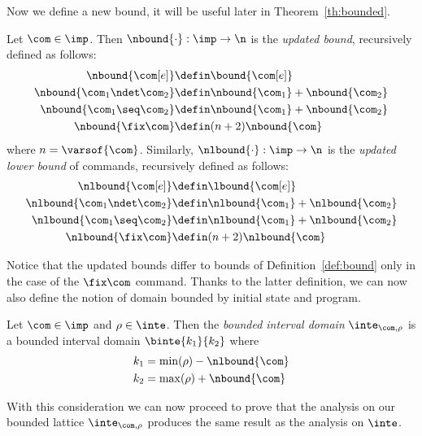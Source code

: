 Now we define a new bound, it will be useful later in
Theorem~\ref{th:bounded}.

\begin{definition}\label{def:newbound}
  Let \(\com\in\imp\). Then \(\nbound{\cdot} : \imp \to \n\) is the
  \emph{updated bound}, recursively defined as follows:
  \begin{align*}
    \nbound{\com[e]} & \defin \bound{\com[e]} \\
    \nbound{\com_1 \ndet \com_2} & \defin \nbound{\com_1} + \nbound{\com_2} \\
    \nbound{\com_1 \seq \com_2} & \defin \nbound{\com_1} + \nbound{\com_2} \\
    \nbound{\fix\com} & \defin (n+2)\nbound{\com} \\
  \end{align*}
  where \(n = \varsof{\com}\). Similarly,
  \(\nlbound{\cdot} : \imp \to \n\) is the \emph{updated lower bound}
  of commands, recursively defined as follows:
  \begin{align*}
    \nlbound{\com[e]} & \defin \lbound{\com[e]} \\
    \nlbound{\com_1 \ndet \com_2} & \defin \nlbound{\com_1} + \nlbound{\com_2} \\
    \nlbound{\com_1 \seq \com_2} & \defin \nlbound{\com_1} + \nlbound{\com_2} \\
    \nlbound{\fix\com} & \defin (n+2)\nlbound{\com} \\
  \end{align*}
\end{definition}

Notice that the updated bounds differ to bounds of
Definition~\ref{def:bound} only in the case of the \(\fix\com\)
command.  Thanks to the latter definition, we can now also define the
notion of domain bounded by initial state and program.

\begin{definition}\label{def:boundedbycom}
  Let \(\com\in\imp\) and \(\rho \in \inte\). Then the \emph{bounded
    interval domain} \(\inte_{\com,\rho}\) is a bounded interval
  domain \(\binte{k_1}{k_2}\) where
  \begin{align*}
    k_1 & = \min(\rho) - \nlbound{\com} \\
    k_2 & = \max(\rho) + \nbound{\com}
  \end{align*}
\end{definition}

With this consideration we can now proceed to prove that the analysis
on our bounded lattice \(\inte_{\com,\rho}\) produces the same result
as the analysis on \(\inte\).

